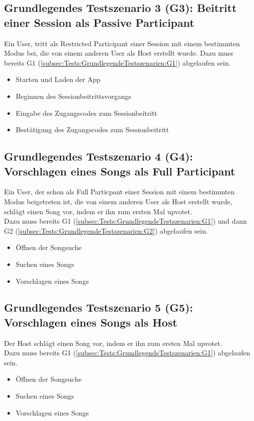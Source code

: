 \documentclass[oneside, ngerman]{sdqtechreport}
\begin{document}
\subsection{Grundlegendes Testszenario 3 (G3): Beitritt einer Session als Passive Participant}
\label{subsec:Tests:GrundlegendeTestszenarien:G3}
Ein User, tritt als Restricted Participant einer Session mit einem bestimmten Modus bei, die von einem anderen User als Host erstellt wurde.
Dazu muss bereits G1 (\ref{subsec:Tests:GrundlegendeTestszenarien:G1}) abgelaufen sein.
\begin{itemize}
    \item Starten und Laden der App
    \item Beginnen des Sessionbeitrittsvorgangs
    \item Eingabe des Zugangscodes zum Sessionbeitritt
    \item Bestätigung des Zugangscodes zum Sessionbeitritt
\end{itemize}

\subsection{Grundlegendes Testszenario 4 (G4): Vorschlagen eines Songs als Full Participant}
\label{subsec:Tests:GrundlegendeTestszenarien:G4}
Ein User, der schon als Full Particpant einer Session mit einem bestimmten Modus beigetreten ist, die von einem anderen User als Host erstellt wurde, schlägt einen Song vor, indem er ihn zum ersten Mal upvotet. \\
Dazu muss bereits G1 (\ref{subsec:Tests:GrundlegendeTestszenarien:G1}) und dann G2 (\ref{subsec:Tests:GrundlegendeTestszenarien:G2}) abgelaufen sein.
\begin{itemize}
    \item Öffnen der Songsuche
    \item Suchen eines Songs
    \item Vorschlagen eines Songs
\end{itemize}

\subsection{Grundlegendes Testszenario 5 (G5): Vorschlagen eines Songs als Host}
\label{subsec:Tests:GrundlegendeTestszenarien:G5}
Der Host schlägt einen Song vor, indem er ihn zum ersten Mal upvotet. \\
Dazu muss bereits G1 (\ref{subsec:Tests:GrundlegendeTestszenarien:G1}) abgelaufen sein.
\begin{itemize}
    \item Öffnen der Songsuche
    \item Suchen eines Songs
    \item Vorschlagen eines Songs
\end{itemize}
\end{document}
